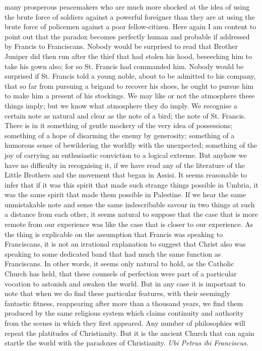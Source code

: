 \documentclass{book}
\begin{document}
many prosperous peacemakers who are much more shocked at the idea of using the brute force of soldiers against a powerful foreigner than they are at using the brute force of policemen against a poor fellow-citizen. Here again I am content to point out that the paradox becomes perfectly human and probable if addressed by Francis to Franciscans. Nobody would be surprised to read that Brother Juniper did then run after the thief that had stolen his hood, beseeching him to take his gown also; for so St. Francis had commanded him. Nobody would be surprised if St. Francis told a young noble, about to be admitted to his company, that so far from pursuing a brigand to recover his shoes, he ought to pursue him to make him a present of his stockings. We may like or not the atmosphere these things imply; but we know what atmosphere they do imply. We recognise a certain note as natural and clear as the note of a bird; the note of St. Francis. There is in it something of gentle mockery of the very idea of possessions; something of a hope of disarming the enemy by generosity; something of a humorous sense of bewildering the worldly with the unexpected; something of the joy of carrying an enthusiastic conviction to a logical extreme. But anyhow we have no difficulty in recognising it, if we have read any of the literature of the Little Brothers and the movement that began in Assisi. It seems reasonable to infer that if it was this spirit that made such strange things possible in Umbria, it was the same spirit that made them possible in Palestine. If we hear the same unmistakable note and sense the same indescribable savour in two things at such a distance from each other, it seems natural to suppose that the case that is more remote from our experience was like the case that is closer to our experience. As the thing is explicable on the assumption that Francis was speaking to Franciscans, it is not an irrational explanation to suggest that Christ also was speaking to some dedicated band that had much the same function as Franciscans. In other words, it seems only natural to hold, as the Catholic Church has held, that these counsels of perfection were part of a particular vocation to astonish and awaken the world. But in any case it is important to note that when we do find these particular features, with their seemingly fantastic fitness, reappearing after more than a thousand years, we find them produced by the same religious system which claims continuity and authority from the scenes in which they first appeared. Any number of philosophies will repeat the platitudes of Christianity. But it is the ancient Church that can again startle the world with the paradoxes of Christianity. \emph{Ubi Petrus ibi Franciscus.}
\end{document}
